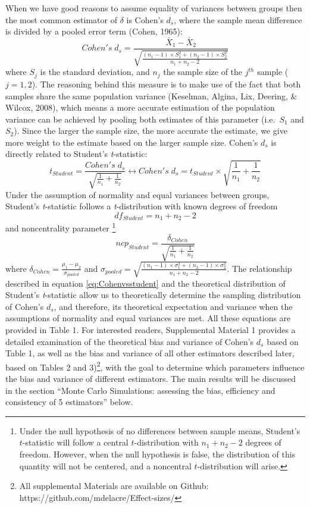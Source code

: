 \documentclass[
  english,
  man,floatsintext]{apa6}
\begin{document}
When we have good reasons to assume equality of variances between groups then the most common estimator of \(\delta\) is Cohen's \(d_{s}\), where the sample mean difference is divided by a pooled error term (Cohen, 1965):
\begin{equation*} 
Cohen's \; d_s = \frac{\bar{X}_1-\bar{X}_2}{\sqrt{\frac{(n_1-1) \times S_1^2+(n_2-1) \times S_2^2}{n_1+n_2-2}}}
\label{eq:Cohends}
\end{equation*}
where \(S_j\) is the standard deviation, and \(n_j\) the sample size of the \(j^{th}\) sample (\(j=1,2\)). The reasoning behind this measure is to make use of the fact that both samples share the same population variance (Keselman, Algina, Lix, Deering, \& Wilcox, 2008), which means a more accurate estimation of the population variance can be achieved by pooling both estimates of this parameter (i.e.~\(S_1\) and \(S_2\)). Since the larger the sample size, the more accurate the estimate, we give more weight to the estimate based on the larger sample size. Cohen's \(d_{s}\) is directly related to Student's \emph{t}-statistic:
\begin{equation} 
t_{Student}=\frac{Cohen's \; d_s}{\sqrt{\frac{1}{n_1}+\frac{1}{n_2}}}\leftrightarrow Cohen's \; d_s =  t_{Student} \times \sqrt{\frac{1}{n_1}+\frac{1}{n_2}}
\label{eq:Cohenvsstudent}
\end{equation}
Under the assumption of normality and equal variances between groups, Student's \emph{t}-statistic follows a \emph{t}-distribution with known degrees of freedom
\begin{equation} 
df_{Student} = n_1+n_2-2
\label{eq:studentdf}
\end{equation}
and noncentrality parameter \footnote{Under the null hypothesis of no differences between sample means, Student's $t$-statistic will follow a central $t$-distribution with $n_1+n_2-2$ degrees of freedom. However, when the null hypothesis is false, the distribution of this quantity will not be centered, and a noncentral $t$-distribution will arise.}
\[ncp_{Student} = \frac{\delta_{Cohen}}{\sqrt{\frac{1}{n_1}+\frac{1}{n_2}}}\]
where \(\delta_{Cohen}= \frac{\mu_1-\mu_2}{\sigma_{pooled}}\) and \(\sigma_{pooled}= \sqrt{\frac{(n_1-1) \times \sigma^2_1+(n_2-1) \times \sigma^2_2}{n_1+n_2-2}}\). The relationship described in equation \ref{eq:Cohenvsstudent} and the theoretical distribution of Student's \emph{t}-statistic allow us to theoretically determine the sampling distribution of Cohen's \(d_s\), and therefore, its theoretical expectation and variance when the assumptions of normality and equal variances are met. All these equations are provided in Table 1. For interested readers, Supplemental Material 1 provides a detailed examination of the theoretical bias and variance of Cohen's \(d_s\) based on Table 1, as well as the bias and variance of all other estimators described later, based on Tables 2 and 3)\footnote{All supplemental Materials are available on Github: https://github.com/mdelacre/Effect-sizes/}, with the goal to determine which parameters influence the bias and variance of different estimators. The main results will be discussed in the section ``Monte Carlo Simulations: assessing the bias, efficiency and consistency of 5 estimators'' below.
\end{document}
